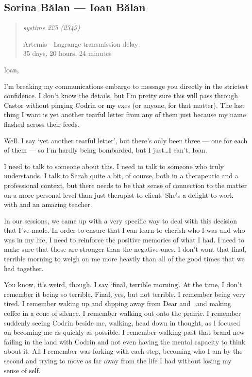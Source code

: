 \hypertarget{sorina-bux103lan-ioan-bux103lan}{%
\subsection{Sorina Bălan — Ioan Bălan}\label{sorina-bux103lan-ioan-bux103lan}}

\begin{quote}
\itshape
systime 225 (2349)

Artemis---Lagrange transmission delay:\\
35 days, 20 hours, 24 minutes
\end{quote}

Ioan,

I'm breaking my communications embargo to message you directly in the strictest confidence. I don't know the details, but I'm pretty sure this will pass through Castor without pinging Codrin or my exes (or anyone, for that matter). The last thing I want is yet another tearful letter from any of them just because my name flashed across their feeds.

Well. I say `yet another tearful letter', but there's only been three — one for each of them — so I'm hardly being bombarded, but I just\ldots I can't, Ioan.

I need to talk to someone about this. I need to talk to someone who truly understands. I talk to Sarah quite a bit, of course, both in a therapeutic and a professional context, but there needs to be that sense of connection to the matter on a more personal level than just therapist to client. She's a delight to work with and an amazing teacher.

In our sessions, we came up with a very specific way to deal with this decision that I've made. In order to ensure that I can learn to cherish who I was and who was in my life, I need to reinforce the positive memories of what I had. I need to make sure that those are stronger than the negative ones. I don't want that final, terrible morning to weigh on me more heavily than all of the good times that we had together.

You know, it's weird, though. I say `final, terrible morning'. At the time, I don't remember it being so terrible. Final, yes, but not terrible. I remember being very tired. I remember waking up and slipping away from Dear and \Partner\ and making coffee in a cone of silence. I remember walking out onto the prairie. I remember suddenly seeing Codrin beside me, walking, head down in thought, as I focused on becoming me as quickly as possible. I remember walking past that brand new failing in the land with Codrin and not even having the mental capacity to think about it. All I remember was forking with each step, becoming who I am by the second and trying to move as far away from the life I had without losing my sense of self.

